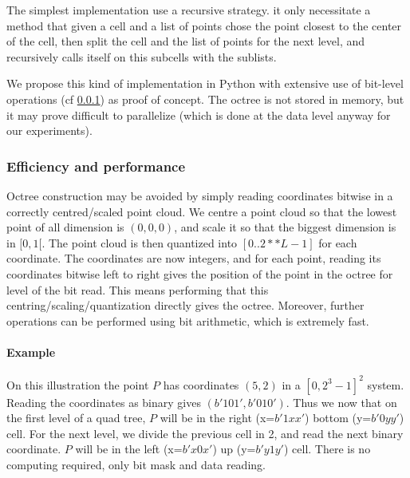 			The simplest implementation use a recursive strategy. it only necessitate a method that given a cell and a list of points chose the point closest to the center of the cell, then split the cell and the list of points for the next level, and recursively calls itself on this subcells with the sublists.
			
			We propose this kind of implementation in Python with extensive use of bit-level operations (cf \ref{subsubsec:bit_coordinates}) as proof of concept.
			The octree is not stored in memory, but it may prove difficult to parallelize (which is done at the data level anyway for our experiments). 
			
			
			
		\subsubsection{Efficiency and performance}
			\label{subsubsec:bit_coordinates}
			Octree construction may be avoided by simply reading coordinates bitwise in a correctly centred/scaled point cloud.
			We centre a point cloud so that the lowest point of all dimension is $(0,0,0)$, and scale it so that the biggest dimension is in $[0,1[$.
			The point cloud is then quantized into $[0..2**L-1]$ for each coordinate.
			The coordinates are now integers, and for each point, reading its coordinates bitwise left to right gives the position of the point in the octree for level of the bit read.
			This means performing that this centring/scaling/quantization directly gives the octree. Moreover, further operations can be performed using bit arithmetic, which is extremely fast.
			
			\paragraph{Example} 
				 
				 On this illustration the point $P$ has coordinates $(5,2)$ in a $[0,2^3-1]^2$ system. Reading the coordinates as binary gives $(b'101',b'010')$.
				 Thus we now that on the first level of a quad tree, $P$ will be in the right (x=$b'1xx'$) bottom (y=$b'0yy'$) cell.
				 For the next level, we divide the previous cell in 2, and read the next binary coordinate. $P$ will be in the left (x=$b'x0x'$) up (y=$b'y1y'$) cell. There is no computing required, only bit mask and data reading.
			
